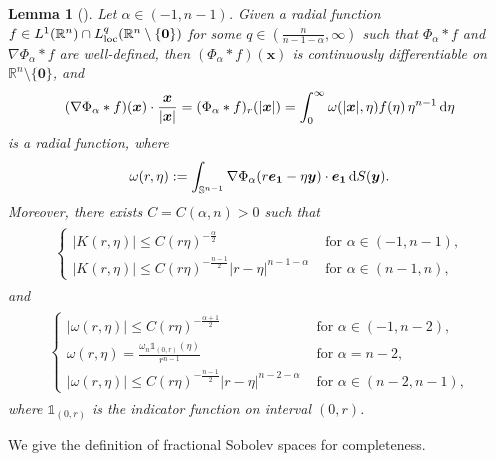 \documentclass[reqno,11pt]{amsart}
\numberwithin{equation}{section}
\newtheorem{lemma}[theorem]{Lemma}
\theoremstyle{definition}
\def\dd{{\, \rm d}}
\begin{document}
\begin{lemma}[]\label{potentially}
Let $\alpha \in (-1,n-1)$.
Given a radial function $f \in L^1(\mathbb{R}^n) \cap L^q_{\rm loc}(\mathbb{R}^n \setminus \{\boldsymbol{0}\})$ for some $q \in (\frac{n}{n - 1 - \alpha}, \infty)$ such that $\Phi_\alpha*f$
and $\nabla\Phi_\alpha*f$ are well-defined,
then $(\Phi_\alpha*f)(\boldsymbol{x})$ is continuously differentiable on $\mathbb{R}^n \setminus \{\boldsymbol{0}\}$, and
    \begin{equation*}
 (\nabla \Phi_\alpha*f)(\boldsymbol{x}) \cdot \frac{\boldsymbol{x}}{|\boldsymbol{x}|}
 = (\Phi_\alpha*f)_r(|\boldsymbol{x}|)
 = \int^{\infty}_0 \omega(|\boldsymbol{x}|,\eta) f(\eta)\,\eta^{n-1}\dd \eta
\end{equation*} is a radial function, where
\[
 \omega(r,\eta) := \int_{\mathbb{S}^{n-1}} \nabla \Phi_\alpha(r\boldsymbol{e_1} - \eta \boldsymbol{y}) \cdot \boldsymbol{e_1} \dd S(\boldsymbol{y}).
\]
Moreover, there exists $C = C(\alpha,n) > 0$ such that
\begin{align*}
\begin{split}
\begin{cases}
    \displaystyle
    |K(r,\eta)| \leq C (r\eta)^{-\frac{\alpha}{2}} & \mbox{ for $\alpha \in(-1,n-1)$}, \\[1mm]
    \displaystyle
    |K(r,\eta)| \leq C(r\eta)^{-\frac{n-1}{2}} |r-\eta|^{n-1-\alpha} & \mbox{ for $\alpha \in (n-1,n)$},
\end{cases}
\end{split}
\end{align*}
and
\begin{align*}
\begin{split}
\begin{cases}
\displaystyle
|\omega(r,\eta)| \leq C (r\eta)^{-\frac{\alpha + 1}{2}} & \mbox{ for $\alpha \in(-1,n-2)$}, \\[1mm]
 \displaystyle
 \omega(r,\eta) = \frac{\omega_n \mathds{1}_{(0,r)}(\eta)}{r^{n-1}}
 & \mbox{ for $\alpha = n-2$}, \\[1mm]
 \displaystyle
|\omega(r,\eta)| \leq C(r\eta)^{-\frac{n-1}{2}} |r-\eta|^{n-2-\alpha}
 & \mbox{ for $\alpha \in (n-2,n-1)$},
\end{cases}
\end{split}
\end{align*}
    where $\mathds{1}_{(0,r)}$ is the indicator function on interval $(0,r)$.
\end{lemma}


We give the definition of fractional Sobolev spaces for completeness.
\end{document}
